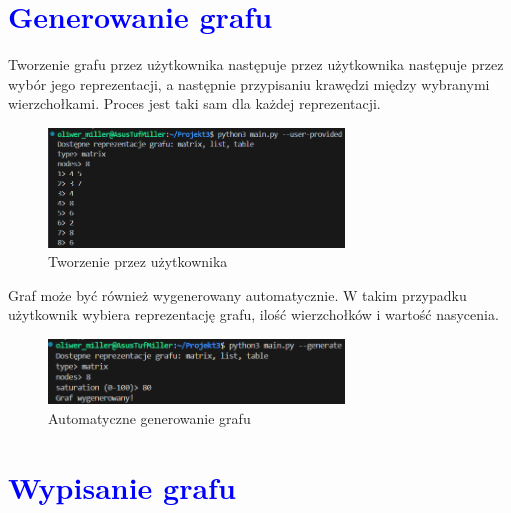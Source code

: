 \documentclass{article}
\begin{document}
	\section*{\textcolor{blue}{Generowanie grafu}}
	\noindent Tworzenie grafu przez użytkownika następuje przez użytkownika następuje przez wybór jego reprezentacji, a następnie przypisaniu krawędzi między wybranymi wierzchołkami. Proces jest taki sam dla każdej reprezentacji.
	
	\begin{figure}[htbp]
		\centering
		\includegraphics[width=0.7\textwidth]{reprezentacja_matrix_g.png} 
		\caption{Tworzenie przez użytkownika}
		\label{fig:moje-zdjecie}
	\end{figure}
	
	 \noindent Graf może być również wygenerowany automatycznie. W takim przypadku użytkownik wybiera reprezentację grafu, ilość wierzchołków i wartość nasycenia.
	
	\begin{figure}[htbp]
		\centering
		\includegraphics[width=0.7\textwidth]{generate_graph.png} 
		\caption{Automatyczne generowanie grafu}
		\label{fig:moje-zdjecie}
	\end{figure}
	
	\clearpage
	
	\section*{\textcolor{blue}{Wypisanie grafu}}
\end{document}
